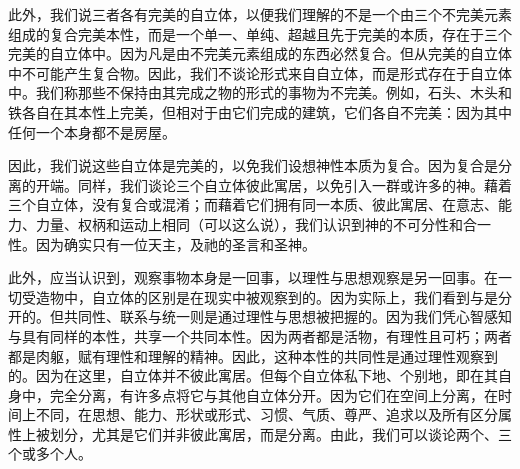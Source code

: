 此外，我们说三者各有完美的自立体，以便我们理解的不是一个由三个不完美元素组成的复合完美本性，而是一个单一、单纯、超越且先于完美的本质，存在于三个完美的自立体中。因为凡是由不完美元素组成的东西必然复合。但从完美的自立体中不可能产生复合物。因此，我们不谈论形式来自自立体，而是形式存在于自立体中。我们称那些不保持由其完成之物的形式的事物为不完美。例如，石头、木头和铁各自在其本性上完美，但相对于由它们完成的建筑，它们各自不完美：因为其中任何一个本身都不是房屋。\par

因此，我们说这些自立体是完美的，以免我们设想神性本质为复合。因为复合是分离的开端。同样，我们谈论三个自立体彼此寓居，以免引入一群或许多的神。藉着三个自立体，没有复合或混淆；而藉着它们拥有同一本质、彼此寓居、在意志、能力、力量、权柄和运动上相同（可以这么说），我们认识到神的不可分性和合一性。因为确实只有一位天主，及祂的圣言和圣神。\par

\par

此外，应当认识到，观察事物本身是一回事，以理性与思想观察是另一回事。在一切受造物中，自立体的区别是在现实中被观察到的。因为实际上，我们看到与是分开的。但共同性、联系与统一则是通过理性与思想被把握的。因为我们凭心智感知与具有同样的本性，共享一个共同本性。因为两者都是活物，有理性且可朽；两者都是肉躯，赋有理性和理解的精神。因此，这种本性的共同性是通过理性观察到的。因为在这里，自立体并不彼此寓居。但每个自立体私下地、个别地，即在其自身中，完全分离，有许多点将它与其他自立体分开。因为它们在空间上分离，在时间上不同，在思想、能力、形状或形式、习惯、气质、尊严、追求以及所有区分属性上被划分，尤其是它们并非彼此寓居，而是分离。由此，我们可以谈论两个、三个或多个人。\par

